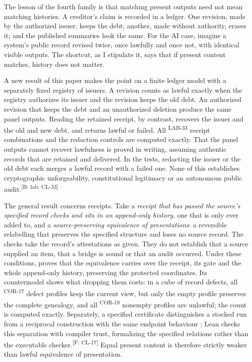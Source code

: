 \documentclass[pdflatex,sn-basic]{sn-jnl}%
\newcommand{\slot}[1]{}%
\newcommand{\claim}[2]{\ifannotated\textsuperscript{\textcolor{blue!60!black}{\tiny[#1: #2]}}\fi}
\newcommand{\rec}[1]{\ifannotated\textsuperscript{\textcolor{blue!60!black}{\tiny#1}}\fi}
\begin{document}
\slot{5.4}
The lesson of the fourth family is that matching present outputs need not mean matching histories. A creditor's claim is recorded in a ledger. One revision, made by the authorized issuer, keeps the debt; another, made without authority, erases it; and the published summaries look the same. For the AI case, imagine a system's public record revised twice, once lawfully and once not, with identical visible outputs. The shortcut, as I stipulate it, says that if present content matches, history does not matter.

A new result of this paper makes the point on a finite ledger model with a separately fixed registry of issuers. A revision counts as lawful exactly when the registry authorizes its issuer and the revision keeps the old debt. An authorized revision that keeps the debt and an unauthorized deletion produce the same panel outputs. Reading the retained receipt, by contrast, recovers the issuer and the old and new debt, and returns lawful or failed. All \numCNineReceiptCombos\rec{LAB-33} receipt combinations and the redaction controls are computed exactly. That the panel outputs cannot recover lawfulness is proved in writing, assuming authentic records that are retained and delivered. In the tests, redacting the issuer or the old debt each merges a lawful record with a failed one. None of this establishes cryptographic unforgeability, constitutional legitimacy or an autonomous public audit.\claim{B: lab}{CL-33}

The general result concerns receipts. Take a \emph{receipt that has passed the source's specified record checks and sits in an append-only history}, one that is only ever added to, and a \emph{source-preserving equivalence of presentations}: a reversible relabelling that preserves the specified structure and loses no source record. The checks take the record's attestations as given. They do not establish that a source supplied an item, that a bridge is sound or that an audit occurred. Under these conditions, \citet{tsiokos2026v1} proves that the equivalence carries over the receipt, its gate and the whole append-only history, preserving the protected coordinates. Its countermodel shows what dropping them costs: in a cube of record defects, all \numVOneDefectProfiles\rec{COR-17} defect profiles keep the current view, but only the empty profile preserves the complete genealogy, and all \numVOneNonemptyProfiles\rec{COR-18} nonempty profiles are unlawful; the count is computed exactly. Separately, a specified certificate distinguishes a stocked run from a reciprocal construction with the same endpoint behaviour \citep{tsiokos2026v10}; Lean checks this separation with compiler trust, formalizing the specified relations rather than the executable checker.\claim{F}{CL-17} Equal present content is therefore strictly weaker than lawful equivalence of presentation.
\end{document}
